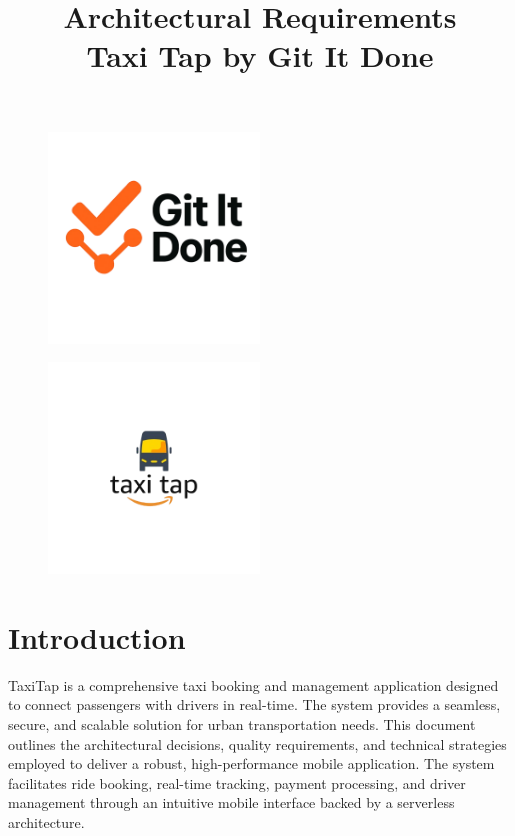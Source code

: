 \documentclass[12pt]{article}
\title{Architectural Requirements\\Taxi Tap by Git It Done}
\date{}
\begin{document}
\maketitle

\begin{figure}[H]
  \centering
  \includegraphics[width=0.5\textwidth]{LogoGroup.png} 
\end{figure}

\begin{figure}[H]
  \centering
  \includegraphics[width=0.5\textwidth]{LogoTaxiTap.png} 
\end{figure}

\newpage

\tableofcontents
\newpage

\section{Introduction}

TaxiTap is a comprehensive taxi booking and management application designed to connect passengers with drivers in real-time. The system provides a seamless, secure, and scalable solution for urban transportation needs. This document outlines the architectural decisions, quality requirements, and technical strategies employed to deliver a robust, high-performance mobile application.
The system facilitates ride booking, real-time tracking, payment processing, and driver management through an intuitive mobile interface backed by a serverless architecture.
\end{document}
